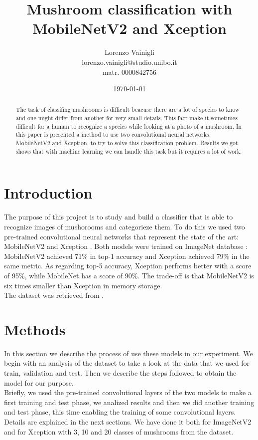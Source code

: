 \documentclass[12pt]{llncs}
\title{Mushroom classification with MobileNetV2 and Xception}
\author{Lorenzo Vainigli \\
lorenzo.vainigli@studio.unibo.it \\
matr. 0000842756}
\institute{Course of Machine Learning \\
Laurea Magistrale in Informatica \\
University of Bologna \\
A.Y. 2020-2021}
\date{\today}
\begin{document}
{\def\addcontentsline#1#2#3{}\maketitle}

\begin{abstract}
The task of classifing mushrooms is difficult beacuse there are a lot of species to know and one might differ from another for very small details. This fact make it sometimes difficult for a human to recognize a species while looking at a photo of a mushroom. In this paper is presented a method to use two convolutional neural networks, MobileNetV2 and Xception, to try to solve this classification problem. Results we got shows that with machine learning we can handle this task but it requires a lot of work.
\end{abstract}

\begingroup
\let\clearpage\relax
\renewcommand{\contentsname}{}
\setcounter{tocdepth}{2} 
\tableofcontents
\endgroup

\section{Introduction}
The purpose of this project is to study and build a classifier that is able to recognize images of mushorooms and categorieze them. To do this we used two pre-trained convolutional neural networks that represent the state of the art: MobileNetV2 \cite{mobilenetv2} and Xception \cite{xception}. Both models were trained on ImageNet database \cite{imagenet}: MobileNetV2 achieved 71\% in top-1 accuracy and Xception achieved 79\% in the same metric. As regarding top-5 accuracy, Xception performs better with a score of 95\%, while MobileNet has a score of 90\%. The trade-off is that MobileNetV2 is six times smaller than Xception in memory storage.\\
The dataset was retrieved from \cite{fgvc}.

\section{Methods}
In this section we describe the process of use these models in our experiment. We begin with an analysis of the dataset to take a look at the data that we used for train, validation and test. Then we describe the steps followed to obtain the model for our purpose. \\
Briefly, we used the pre-trained convolutional layers of the two models to make a first training and test phase, we analized results and then we did another training and test phase, this time enabling the training of some convolutional layers. Details are explained in the next sections. We have done it both for ImageNetV2 and for Xception with 3, 10 and 20 classes of mushrooms from the dataset.
\end{document}
